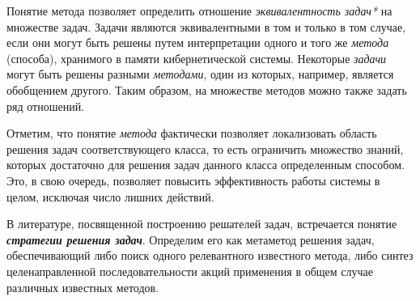 Понятие метода позволяет определить отношение \textit{эквивалентность задач*} на множестве задач. Задачи являются эквивалентными в том и только в том случае, если они могут быть решены путем интерпретации одного и того же \textit{метода} (способа), хранимого в памяти кибернетической системы.
Некоторые \textit{задачи} могут быть решены разными \textit{методами}, один из которых, например, является обобщением другого. Таким образом, на множестве методов можно также задать ряд отношений.

Отметим, что понятие \textit{метода} фактически позволяет локализовать область решения задач соответствующего класса, то есть ограничить множество знаний, которых достаточно для решения задач данного класса определенным способом. Это, в свою очередь, позволяет повысить эффективность работы системы в целом, исключая число лишних действий.

\begin{SCn}
	\begin{scnindent}
		\begin{scnindent}
		\end{scnindent}
	\end{scnindent}
\end{SCn}

В литературе, посвященной построению решателей задач, встречается понятие \textbf{\textit{стратегии решения задач}}. Определим его как метаметод решения задач, обеспечивающий либо поиск одного релевантного известного метода, либо синтез целенаправленной последовательности акций применения в общем случае различных известных методов.

\begin{SCn}
\end{SCn}

